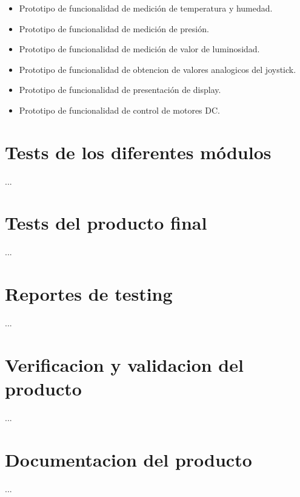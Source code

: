 \begin{itemize}
	\item Prototipo de funcionalidad de medición de temperatura y humedad.
	\item Prototipo de funcionalidad de medición de presión.
	\item Prototipo de funcionalidad de medición de valor de luminosidad.
	\item Prototipo de funcionalidad de obtencion de valores analogicos del joystick.
	\item Prototipo de funcionalidad de presentación de display.
	\item Prototipo de funcionalidad de control de motores DC.
\end{itemize}



\section{Tests de los diferentes módulos}
\label{sec:pruebasHW}

...

\section{Tests del producto final}
\label{sec:pruebasHW}

...

\section{Reportes de testing}
\label{sec:pruebasHW}

...

\section{Verificacion y validacion del producto}
\label{sec:pruebasHW}

...

\section{Documentacion del producto }
\label{sec:pruebasHW}

...



